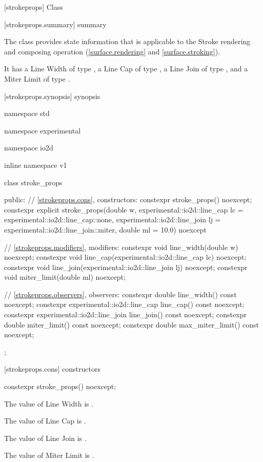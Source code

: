 
 [strokeprops] {Class }

 [strokeprops.summary] { summary}

\pnum
The  class provides state information that is applicable to the Stroke rendering and composing operation (\ref{surface.rendering} and \ref{surface.stroking}).

\pnum
It has a Line Width of type , a Line Cap of type , a Line Join of type , and a Miter Limit of type .

%
 [strokeprops.synopsis] { synopsis}

\begin{codeblock}
namespace std { namespace experimental { namespace io2d { inline namespace v1 {
  class stroke_props {
  public:
    // \ref{strokeprops.cons}, constructors:
    constexpr stroke_props() noexcept;
    constexpr explicit stroke_props(double w,
      experimental::io2d::line_cap lc = experimental::io2d::line_cap::none,
      experimental::io2d::line_join lj = experimental::io2d::line_join::miter,
      double ml = 10.0) noexcept    

    // \ref{strokeprops.modifiers}, modifiers:
    constexpr void line_width(double w) noexcept;
    constexpr void line_cap(experimental::io2d::line_cap lc) noexcept;
    constexpr void line_join(experimental::io2d::line_join lj) noexcept;
    constexpr void miter_limit(double ml) noexcept;
    
    // \ref{strokeprops.observers}, observers:
    constexpr double line_width() const noexcept;
    constexpr experimental::io2d::line_cap line_cap() const noexcept;
    constexpr experimental::io2d::line_join line_join() const noexcept;
    constexpr double miter_limit() const noexcept;
    constexpr double max_miter_limit() const noexcept;
  };
}}}}
\end{codeblock}

 [strokeprops.cons] { constructors}

\begin{itemdecl}
constexpr stroke_props() noexcept;
\end{itemdecl}
\begin{itemdescr}
\pnum
\effects
The value of Line Width is .

\pnum
The value of Line Cap is .

\pnum
The value of Line Join is .

\pnum
The value of Miter Limit is .
\end{itemdescr}

